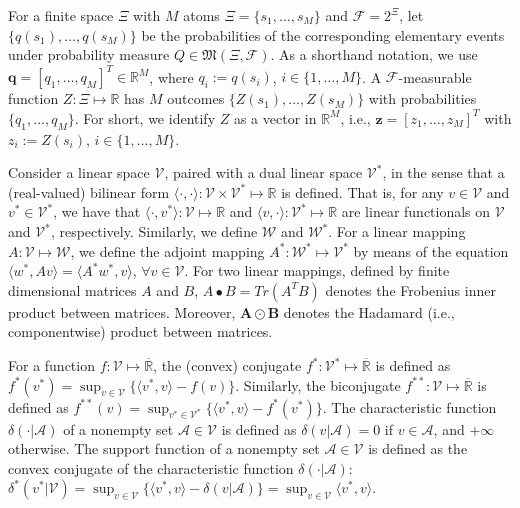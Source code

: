 \documentclass[final,onefignum,onetabnum]{class}
\newcommand{\bs}[1]{\boldsymbol{#1}} %
\newcommand{\Bs}[1]{\mathbb{#1}} %
\newcommand{\Cs}[1]{\mathcal{#1}} %
\newcommand{\Fs}[1]{\mathfrak{#1}} %
\newcommand{\ol}[1]{\overline{#1}}
\newcommand{\measurespace}{\left( \Xi, \Cs{F} \right)}
\begin{document}
For a finite space  $\Xi$ with $M$ atoms $\Xi=\{s_{1}, \ldots, s_{M}\}$ and $\Cs{F}=2^{\Xi}$, \linebreak let $\{q(s_{1}), \ldots, q(s_{M})\}$ be the probabilities of the  corresponding elementary events under probability measure $Q \in \Fs{M}\measurespace$. As a shorthand notation, we use $\bs{q}=[q_{1}, \ldots, q_{M}]^{T} \in \Bs{R}^{M}$, where $q_{i}:=q(s_{i})$, $i \in \{1, \ldots, M\}$. A $\Cs{F}$-measurable function $Z: \Xi \mapsto \Bs{R}$ has $M$   outcomes $\{Z(s_{1}), \ldots, Z(s_{M})\}$ with probabilities $\{q_{1}, \ldots, q_{M}\}$. For short, we identify $Z$ as  a vector in $\Bs{R}^{M}$, i.e., $\bs{z}=[z_{1}, \ldots, z_{M}]^{T}$ with $z_{i}:=Z(s_{i})$, $i \in \{1, \ldots, M\}$.


Consider a linear space $\Cs{V}$, paired with a dual linear space $\Cs{V}^{*}$, in the sense that  a (real-valued) bilinear form $\langle \cdot, \cdot \rangle: \Cs{V} \times \Cs{V}^{*} \mapsto \Bs{R}$  is defined. That is, for any $v \in \Cs{V}$ and $v^{*} \in \Cs{V}^{*}$,  we have that $\langle \cdot, v^{*} \rangle: \Cs{V}  \mapsto \Bs{R}$ and $\langle v, \cdot \rangle: \Cs{V}^{*}  \mapsto \Bs{R}$ are linear functionals on $\Cs{V}$ and $\Cs{V}^{*}$, respectively. Similarly, we define $\Cs{W}$ and $\Cs{W}^{*}$. For a linear mapping $A: \Cs{V} \mapsto \Cs{W}$, we define the adjoint mapping $A^{*}: \Cs{W}^{*} \mapsto \Cs{V}^{*}$ by means of the equation $\langle w^{*}, Av \rangle= \langle A^{*}w^{*}, v \rangle$, $\forall v \in \Cs{V}$. 
For two linear mappings, defined by finite dimensional matrices $A$ and $B$,  $A\bullet B=Tr(A^TB)$ denotes the Frobenius inner product between
matrices. Moreover, $\bs{A} \odot \bs{B}$ denotes the Hadamard (i.e., componentwise) product between matrices. 

For a  function $f: \Cs{V} \mapsto \ol{\Bs{R}}$, the (convex) conjugate $f^{*}: \Cs{V}^{*} \mapsto \ol{\Bs{R}}$ is defined as $f^{*}(v^{*})=\sup_{v \in \Cs{V}} \{\langle v^{*},v \rangle - f(v) \} $. Similarly, the biconjugate  $f^{**}: \Cs{V} \mapsto \ol{\Bs{R}}$ is defined as $f^{**}(v)=\sup_{v^{*} \in \Cs{V}^{*}} \{\langle v^{*},v \rangle - f^{*}(v^{*}) \} $. The characteristic function $\delta(\cdot|\Cs{A})$ of a nonempty set $\Cs{A} \in \Cs{V}$ is defined as $\delta(v|\Cs{A})=0$ if $v \in \Cs{A}$, and $+\infty$ otherwise. The support function of a   nonempty set $\Cs{A} \in \Cs{V}$   is defined as the convex conjugate of the characteristic function $\delta(\cdot|\Cs{A})$: $\delta^{*}(v^{*}|\Cs{V})=\sup_{v \in \Cs{V}} \{\langle v^{*},v \rangle -  \delta(v|\Cs{A}) \}= \sup_{v \in \Cs{V}} \langle v^{*},v \rangle  $.
\end{document}
